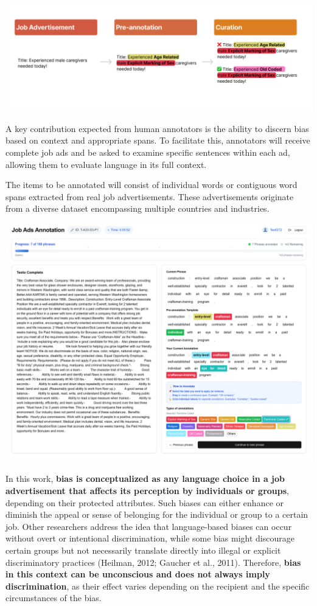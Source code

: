 \documentclass[
]{book}
\begin{document}
\includegraphics{images/annotation_process.png}

A key contribution expected from human annotators is the ability to discern bias based on context and appropriate spans. To facilitate this, annotators will receive complete job ads and be asked to examine specific sentences within each ad, allowing them to evaluate language in its full context.

The items to be annotated will consist of individual words or contiguous word spans extracted from real job advertisements. These advertisements originate from a diverse dataset encompassing multiple countries and industries.

\includegraphics{images/annotation_app.png}

In this work, \textbf{bias is conceptualized as any language choice in a job advertisement that affects its perception by individuals or groups}, depending on their protected attributes. Such biases can either enhance or diminish the appeal or sense of belonging for the individual or group to a certain job. Other researchers address the idea that language-based biases can occur without overt or intentional discrimination, while some bias might discourage certain groups but not necessarily translate directly into illegal or explicit discriminatory practices (Heilman, 2012; Gaucher et al., 2011). Therefore, \textbf{bias in this context can be unconscious and does not always imply discrimination}, as their effect varies depending on the recipient and the specific circumstances of the bias.
\end{document}
